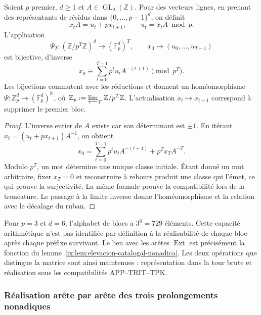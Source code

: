 \begin{proposition}
\label{ix:prop:ch-hensel-bruto}
Soient \(p\) premier, \(d\geq1\) et \(A\in\operatorname{GL}_d(\mathbb Z)\). Pour des vecteurs lignes, en prenant des représentants de résidus dans \(\{0,\ldots,p-1\}^d\), on définit
\[
 x_tA=u_t+px_{t+1},\qquad u_t=x_tA\bmod p.
\]
L'application
\[
 \Psi_T:(\mathbb Z/p^T\mathbb Z)^d\longrightarrow
             (\mathbb F_p^d)^T,\qquad
 x_0\longmapsto(u_0,\ldots,u_{T-1})
\]
est bijective, d’inverse
\[
 x_0\equiv\sum_{t=0}^{T-1}p^tu_tA^{-(t+1)}\pmod{p^T}.
\]
Les bijections commutent avec les réductions et donnent un homéomorphisme
\(\Psi:\mathbb Z_p^d\to(\mathbb F_p^d)^{\mathbb N}\), où
\(\mathbb Z_p:=\varprojlim_T\mathbb Z/p^T\mathbb Z\). L’actualisation
\(x_t\mapsto x_{t+1}\) correspond à supprimer le premier bloc.
\end{proposition}

\begin{proof}
L'inverse entier de \(A\) existe car son déterminant est \(\pm1\). En itérant \(x_t=(u_t+px_{t+1})A^{-1}\), on obtient
\[
 x_0=\sum_{t=0}^{T-1}p^tu_tA^{-(t+1)}+p^Tx_TA^{-T}.
\]
Modulo \(p^T\), un mot détermine une unique classe initiale. Étant donné un
mot arbitraire, fixer \(x_T=0\) et reconstruire à rebours produit une
classe qui l’émet, ce qui prouve la surjectivité. La même formule
prouve la compatibilité lors de la troncature. Le passage à la limite inverse donne
l’homéomorphisme et la relation avec le décalage du ruban.
\end{proof}

Pour \(p=3\) et \(d=6\), l’alphabet de blocs a \(3^6=729\)
éléments. Cette capacité arithmétique n’est pas identifiée par définition à
la réalisabilité de chaque bloc après chaque préfixe survivant. Le
lien avec les arêtes \(\operatorname{Ext}\) est précisément la fonction
du lemme~\ref{ix:lem:elevacion-catalogal-nonadica}. Les deux
opérations que distingue la matrice sont ainsi maintenues : représentation dans la tour brute et
réalisation sous les compatibilités APP--TRIT--TPK.




\subsubsection{Réalisation arête par arête des trois prolongements nonadiques}
\label{ix:subsubsec:tres-vueltas-ext-ch}

